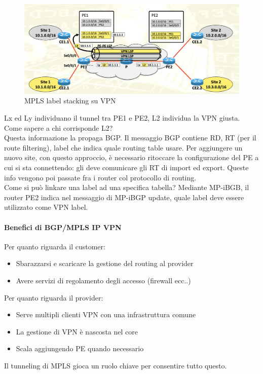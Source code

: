 \documentclass{article}
\begin{document}
\begin{figure}[H]
    \centering
    \includegraphics[scale=0.5]{figures/vpn label stacking.png}
    \caption{MPLS label stacking su VPN}
\end{figure}
Lx ed Ly individuano il tunnel tra PE1 e PE2, L2 individua la VPN giusta. Come sapere a chi corrisponde L2? \\ Questa informazione la propaga BGP. Il messaggio BGP contiene RD, RT (per il route filtering), label che indica quale routing table usare. Per aggiungere un nuovo site, con questo approccio, è necessario ritoccare la configurazione del PE a cui si sta connettendo: gli deve comunicare gli RT di import ed export. Queste info vengono poi passate fra i router col protocollo di routing. \\ Come si può linkare una label ad una specifica tabella? Mediante MP-iBGB, il router PE2 indica nel messaggio di MP-iBGP update, quale label deve essere utilizzato come VPN label.

\paragraph{Benefici di BGP/MPLS IP VPN} Per quanto riguarda il customer:
\begin{itemize}
    \item Sbarazzarsi e scaricare la gestione del routing al provider
    \item Avere servizi di regolamento degli accesso (firewall ecc..)
\end{itemize}
Per quanto riguarda il provider:
\begin{itemize}
    \item Serve multipli clienti VPN con una infrastruttura comune
    \item La gestione di VPN è nascosta nel core
    \item Scala aggiungendo PE quando necessario
\end{itemize}
Il tunneling di MPLS gioca un ruolo chiave per consentire tutto questo.
\end{document}
